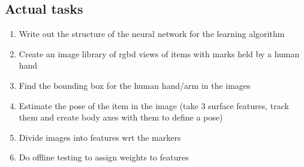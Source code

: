 \documentclass[10pt]{article}
\begin{document}
 \subsection{Actual tasks}
 \begin{enumerate}
 \item Write out the structure of the neural network for the learning algorithm
 \item Create an image library of rgbd views of items with marks held by a human hand
 \item Find the bounding box for the human hand/arm in the images
 \item Estimate the pose of the item in the image (take 3 surface features, track them and create body axes with them to define a pose)
 \item Divide images into features wrt the markers
 \item Do offline testing to assign weights to features
\end{enumerate} 
\nocite{*} 
 


 
\end{document}
